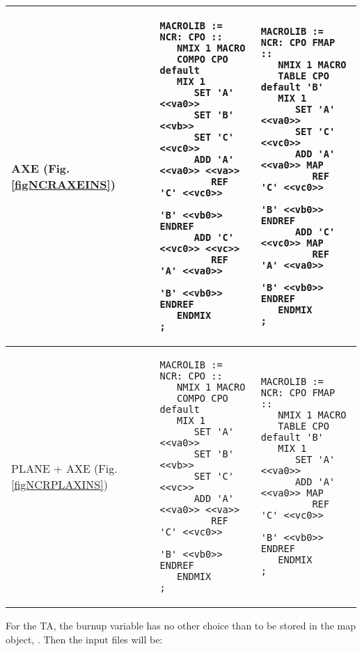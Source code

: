\begin{center}
\begin{supertabular}{|p{0.1\textwidth}|p{0.4\textwidth}|p{0.4\textwidth}|}
AXE (Fig. \ref{figNCRAXEINS}) & 
\begin{verbatim}
MACROLIB := NCR: CPO ::
   NMIX 1 MACRO 
   COMPO CPO default
   MIX 1 
      SET 'A' <<va0>>
      SET 'B' <<vb>>
      SET 'C' <<vc0>>
      ADD 'A' <<va0>> <<va>>
         REF  'C' <<vc0>> 
              'B' <<vb0>> ENDREF
      ADD 'C' <<vc0>> <<vc>>
         REF  'A' <<va0>> 
              'B' <<vb0>> ENDREF
   ENDMIX
;
\end{verbatim} &
\begin{verbatim}
MACROLIB := NCR: CPO FMAP ::
   NMIX 1 MACRO 
   TABLE CPO default 'B' 
   MIX 1 
      SET 'A' <<va0>>
      SET 'C' <<vc0>>
      ADD 'A' <<va0>> MAP
         REF  'C' <<vc0>> 
              'B' <<vb0>> ENDREF
      ADD 'C' <<vc0>> MAP
         REF  'A' <<va0>> 
              'B' <<vb0>> ENDREF
   ENDMIX
;
\end{verbatim} \\
\hline
PLANE + AXE (Fig. \ref{figNCRPLAXINS}) & 
\begin{verbatim}
MACROLIB := NCR: CPO ::
   NMIX 1 MACRO 
   COMPO CPO default
   MIX 1 
      SET 'A' <<va0>>
      SET 'B' <<vb>>
      SET 'C' <<vc>>
      ADD 'A' <<va0>> <<va>>
         REF  'C' <<vc0>> 
              'B' <<vb0>> ENDREF
   ENDMIX
;
\end{verbatim} &
\begin{verbatim}
MACROLIB := NCR: CPO FMAP ::
   NMIX 1 MACRO 
   TABLE CPO default 'B' 
   MIX 1 
      SET 'A' <<va0>>
      ADD 'A' <<va0>> MAP
         REF  'C' <<vc0>> 
              'B' <<vb0>> ENDREF
   ENDMIX
;
\end{verbatim} \\
\hline
\end{supertabular}
\end{center}

For the TA, the burnup variable has no other choice than to be stored in the {\sc map} object, . Then the input files will be: \\


